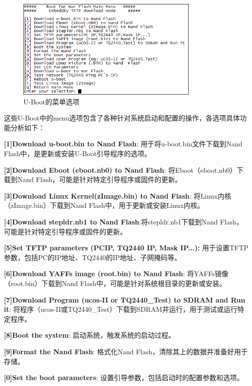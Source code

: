     \begin{figure}[h]
    	\centering
    	\includegraphics[width=0.8\textwidth]{figures/08-01-U-Boot的菜单选项.png}
    	\caption{U-Boot的菜单选项}
    	\label{U-Boot的菜单选项}
    \end{figure}
    
    这些U-Boot中的menu选项包含了各种针对系统启动和配置的操作，各选项具体功能分析如下：
    
   \textbf{[1]Download u-boot.bin to Nand Flash}: 用于将u-boot.bin文件下载到Nand Flash中，是更新或安装U-Boot引导程序的选项。
    
    \textbf{[2]Download Eboot (eboot.nb0) to Nand Flash}: 将Eboot（eboot.nb0）下载到Nand Flash，可能是针对特定引导程序或固件的更新。
    
   \textbf{[3]Download Linux Kernel(zImage.bin) to Nand Flash}: 将Linux内核（zImage.bin）下载到Nand Flash中，用于更新或安装Linux内核。
    
    \textbf{[4]Download stepldr.nb1 to Nand Flash}:将stepldr.nb1下载到Nand Flash，可能是针对特定引导程序或固件的更新。
    
    \textbf{[5]Set TFTP parameters (PCIP, TQ2440 IP, Mask IP...):} 用于设置TFTP参数，包括PC的IP地址、TQ2440的IP地址、子网掩码等。
    
    \textbf{[6]Download YAFFs image (root.bin) to Nand Flash}: 将YAFFs镜像（root.bin）下载到Nand Flash中，可能是针对系统根目录的更新或安装。
    
    \textbf{[7]Download Program (ucos-II or TQ2440_Test) to SDRAM and Run it}: 将程序（ucos-II或TQ2440_Test）下载到SDRAM并运行，用于测试或运行特定程序。
    
    \textbf{[8]Boot the system}: 启动系统，触发系统的启动过程。
    
    \textbf{[9]Format the Nand Flash}: 格式化Nand Flash，清除其上的数据并准备好用于存储。
    
    \textbf{[0]Set the boot parameters}: 设置引导参数，包括启动时的配置参数和选项。
    
